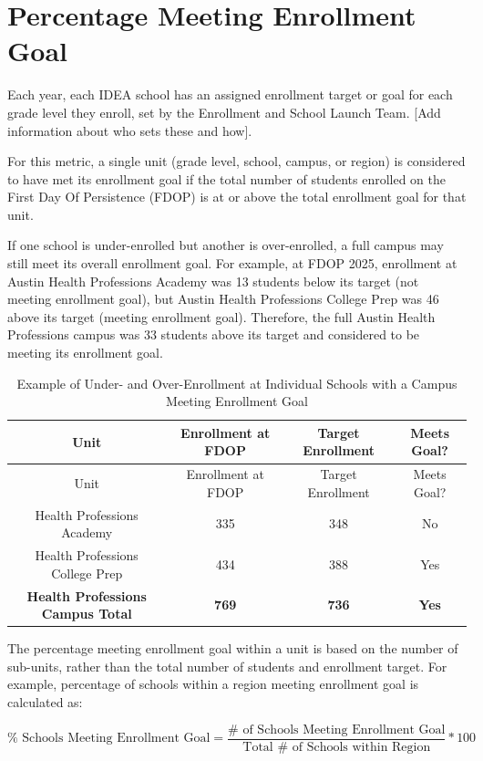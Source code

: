 \documentclass[
  letterpaper,
  DIV=11,
  numbers=noendperiod]{scrreprt}
\begin{document}
\section{Percentage Meeting Enrollment Goal}\label{sec-06Goal}

Each year, each IDEA school has an assigned enrollment target or goal
for each grade level they enroll, set by the Enrollment and School
Launch Team. {[}Add information about who sets these and how{]}.

For this metric, a single unit (grade level, school, campus, or region)
is considered to have met its enrollment goal if the total number of
students enrolled on the First Day Of Persistence (FDOP) is at or above
the total enrollment goal for that unit.

If one school is under-enrolled but another is over-enrolled, a full
campus may still meet its overall enrollment goal. For example, at FDOP
2025, enrollment at Austin Health Professions Academy was 13 students
below its target (not meeting enrollment goal), but Austin Health
Professions College Prep was 46 above its target (meeting enrollment
goal). Therefore, the full Austin Health Professions campus was 33
students above its target and considered to be meeting its enrollment
goal.

\begin{longtable}[]{@{}cccc@{}}
\caption{Example of Under- and Over-Enrollment at Individual Schools
with a Campus Meeting Enrollment Goal}\tabularnewline
\toprule\noalign{}
Unit & Enrollment at FDOP & Target Enrollment & Meets Goal? \\
\midrule\noalign{}
\endfirsthead
\toprule\noalign{}
Unit & Enrollment at FDOP & Target Enrollment & Meets Goal? \\
\midrule\noalign{}
\endhead
\bottomrule\noalign{}
\endlastfoot
Health Professions Academy & 335 & 348 & No \\
Health Professions College Prep & 434 & 388 & Yes \\
\textbf{Health Professions Campus Total} & \textbf{769} & \textbf{736} &
\textbf{Yes} \\
\end{longtable}

The percentage meeting enrollment goal within a unit is based on the
number of sub-units, rather than the total number of students and
enrollment target. For example, percentage of schools within a region
meeting enrollment goal is calculated as:

\[{\% \text{ Schools Meeting Enrollment Goal}} = \frac{\# \text{ of Schools Meeting Enrollment Goal}}{\text{Total } \# \text{ of Schools within Region}}*100\]
\end{document}
